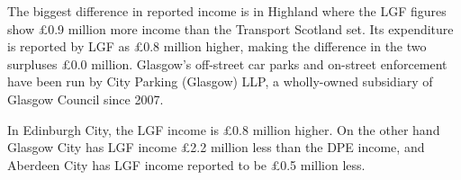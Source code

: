 \documentclass[
  12pt,
]{article}
\begin{document}
The biggest difference in reported income is in Highland where the LGF figures show £0.9 million more income than the Transport Scotland set. Its expenditure is reported by LGF as £0.8 million higher, making the difference in the two surpluses £0.0 million. Glasgow's off-street car parks and on-street enforcement have been run by City Parking (Glasgow) LLP, a wholly-owned subsidiary of Glasgow Council since 2007.

In Edinburgh City, the LGF income is £0.8 million higher. On the other hand Glasgow City has LGF income £2.2 million less than the DPE income, and Aberdeen City has LGF income reported to be £0.5 million less.

\newpage
\begin{landscape}
\begin{table}[H]


\end{table}
\end{landscape}
\end{document}
